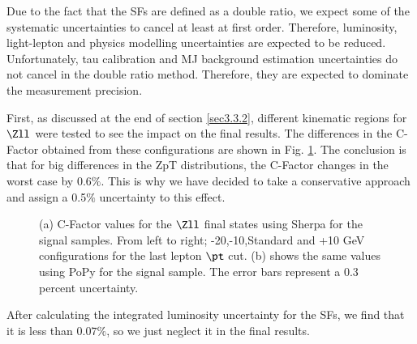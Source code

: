 Due to the fact that the SFs are defined as a double ratio, we expect some of the systematic uncertainties to cancel at least at first order. Therefore, luminosity, light-lepton and physics modelling uncertainties are expected to be reduced. Unfortunately, tau calibration and MJ background estimation uncertainties do not cancel in the double ratio method. Therefore, they are expected to dominate the measurement precision.

First, as discussed at the end of section \ref{sec3.3.2}, different kinematic regions for $\Zll$ were tested to see the impact on the final results. The differences in the C-Factor obtained from these configurations are shown in Fig. \ref{Fig15}. The conclusion is that for big differences in the ZpT distributions, the C-Factor changes in the worst case by 0.6$\%$. This is why we have decided to take a conservative approach and assign a 0.5$\%$ uncertainty to this effect.

\begin{figure}[htbp]
	\centering
	\caption{ (a) C-Factor values for the $\Zll$ final states using Sherpa for the signal samples. From left to right; -20,-10,Standard and +10 GeV configurations for the last lepton $\pt$ cut. (b) shows the same values using PoPy for the signal sample. The error bars represent a 0.3 percent uncertainty. }
	\label{Fig15}
\end{figure}

After calculating the integrated luminosity uncertainty for the SFs, we find that it is less than $0.07\%$, so we just neglect it in the final results. 


